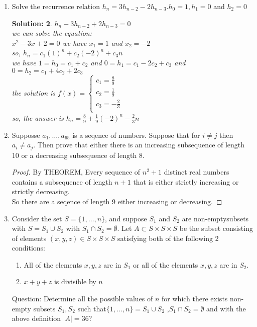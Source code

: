 \documentclass{article}
\theoremstyle{break}
\newtheorem*{solution*}{\textbf{Solution:} }
\begin{document}
\begin{enumerate}
\begin{solution*}
        \end{solution*}
        \vspace{10mm}
        \item Solve  the  recurrence  relation $h_n= 3h_{n−2}−2h_{n−3}.h_0=  1,h_1=  0 $ and $h_2= 0$
        \begin{solution*}
        $h_n - 3h_{n-2} + 2h_{n-3} = 0$\\
        we can solve the equation:\\
        $x^2 - 3x + 2 = 0$
        we have $x_1 = 1$ and $x_2 = -2$\\
        so, $h_n = c_1 (1)^n + c_2 (-2)^n + c_3n$\\
        we have $1 =h_0 = c_1 + c_2 $ and $0 = h_1 = c_1 - 2c_2 +  c_3$ and $0 = h_2 = c_1 + 4c_2 + 2c_3$\\
        the solution is
        $ f(x)=\left\{
                \begin{aligned}
                c_1 =  \frac89 \\
                c_2 =  \frac19\\
                c_3 =  - \frac23\\
                \end{aligned}
                \right.
                $\\
        so, the answer is  $h_n = \frac89 + \frac19 (-2)^n - \frac23 n$
        \end{solution*}
        \vspace{10mm}
        \item Supposse $a_1, \dots  , a_{65}$ is a seqence of numbers.  Suppose that for $i \neq j$ then $a_i \neq a_j$.  Then prove that either there is an increasing subsequence of length 10 or a decreasing subsequence of length 8.
        \begin{proof}
        By THEOREM, Every sequence of $n^2+1$ distinct real numbers contains a subsequence of length $n+1$ that is either strictly increasing or strictly decreasing.\\
        So there are  a seqence of length 9 either increasing or decreasing.
        \end{proof}
        \newpage
        \item Consider the set $S=\{1, \dots , n\}$,  and suppose $S_1$ and $S_2$ are non-emptysubsets with $S=S_1  \cup S_2 $ with $S_1 \cap S_2=\emptyset$.  Let $A\subset S\times S \times S$ be the subset consisting of elements $(x, y, z) \in S \times S \times S$ satisfying both of the following 2 conditions:
        \begin{enumerate}
                \item All of the elements $x, y, z$ are in $S_1$ or all of the elements $x, y, z$ are in $S_2$.
                \item $x+y+z $ is divisible by $n$
        \end{enumerate}
        Question: Determine  all  the  possible  values  of $n$ for  which  there  exists  non-empty subsets $S_1, S_2$ such that$ \{1,  \dots , n\}=S_1 \cup S_2$ ,$S_1 \cap S_2=\emptyset$ and with the above definition $ |A|= 36$?
        
\end{enumerate}
\end{document}
